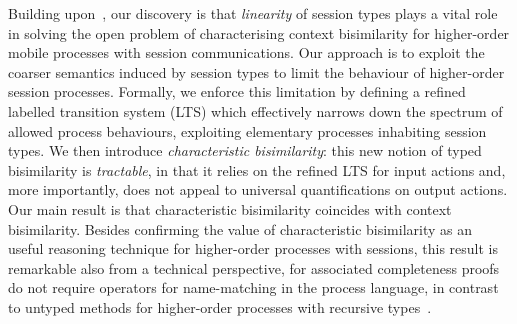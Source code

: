 Building upon~\cite{SangiorgiD:expmpa,San96H,JeffreyR05}, 
our discovery is that \emph{linearity} of session types plays a vital role 
% 
in 
solving 
the %
open problem 
of characterising context bisimilarity for higher-order mobile processes with session communications.
Our approach is to exploit 
the coarser semantics induced by session types to limit
the behaviour of higher-order session processes. 
 Formally, we enforce this limitation by defining
a refined labelled transition system (LTS)
which effectively 
narrows down the spectrum of allowed process behaviours, 
exploiting elementary processes inhabiting session types.
We then introduce \emph{characteristic bisimilarity}: this  
 new notion of typed bisimilarity   is 
\emph{tractable}, in that 
it relies on the refined LTS for input actions and, more importantly, 
does not appeal to universal quantifications on output actions. 
Our main result is that characteristic  %
bisimilarity coincides with context bisimilarity.
Besides confirming the value of characteristic bisimilarity as an useful reasoning technique for 
higher-order processes with sessions,
this result is 
remarkable 
also from a technical perspective, for associated 
completeness proofs do not require 
operators for 
name-matching in the process language, in contrast to untyped methods for  higher-order processes
with recursive types~\cite{JeffreyR05}.



